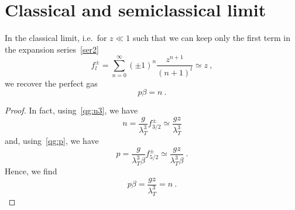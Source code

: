 \section{Classical and semiclassical limit}

    In the classical limit, i.e.~for $z \ll 1$ such that we can keep only the first term in the expansion series~\eqref{ser2}  
    \begin{equation*}
        f_l^\pm = \sum_{n=0}^\infty (\pm 1)^n \frac{z^{n+1}}{(n+1)^l} \simeq z ~,
    \end{equation*}
    we recover the perfect gas 
    \begin{equation*}
        p \beta = n ~.
    \end{equation*}
    \begin{proof}
        In fact, using~\eqref{qg:n3}, we have 
        \begin{equation*}
            n = \frac{g}{\lambda_T^3} f^\pm_{3/2} \simeq \frac{gz}{\lambda_T^3} 
        \end{equation*}
        and, using~\eqref{qg:p}, we have
        \begin{equation*}
            p = \frac{g}{\lambda_T^3 \beta} f^\pm_{5/2} \simeq \frac{gz}{\lambda_T^3\beta}  ~.
        \end{equation*}
        Hence, we find
        \begin{equation*}
            p \beta = \frac{gz}{\lambda_T^3} = n ~.
        \end{equation*}
    \end{proof}

